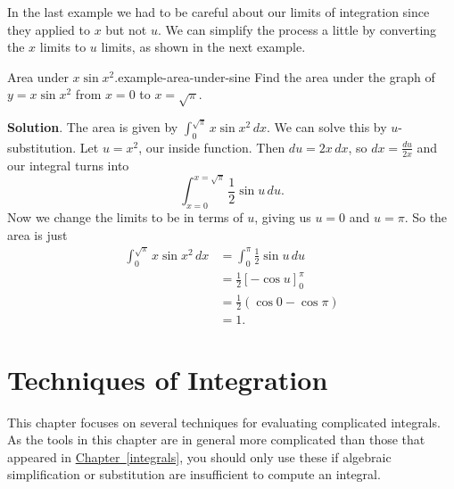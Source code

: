 \documentclass[10pt,]{book}
\numberwithin{equation}{section}
\begin{document}
\hypertarget{p-491}{}%
In the last example we had to be careful about our limits of integration since they applied to \(x\) but not \(u\). We can simplify the process a little by converting the \(x\) limits to \(u\) limits, as shown in the next example.%
\begin{example}{Area under \(x\sin x^{2}\).}{example-area-under-sine}%
\hypertarget{p-492}{}%
Find the area under the graph of \(y = x\sin x^{2}\) from \(x=0\) to \(x = \sqrt{\pi}\).%
\par\smallskip%
\noindent\textbf{Solution}.\hypertarget{solution-109}{}\quad%
\hypertarget{p-493}{}%
The area is given by \(\int_{0}^{\sqrt{\pi}}x\sin x^{2}\,dx\). We can solve this by \(u\)-substitution. Let \(u = x^{2}\), our inside function. Then \(du = 2x\,dx\), so \(dx = \frac{du}{2x}\) and our integral turns into%
\begin{equation*}
\int_{x=0}^{x=\sqrt{\pi}}\frac{1}{2}\sin u\,du.
\end{equation*}
Now we change the limits to be in terms of \(u\), giving us \(u = 0\) and \(u = \pi\). So the area is just%
\begin{align*}
\int_{0}^{\sqrt{\pi}}x\sin x^{2}\,dx & = \int_{0}^{\pi}\frac{1}{2}\sin u\,du \\
& = \frac{1}{2}[-\cos u]_{0}^{\pi} \\
& = \frac{1}{2}(\cos0 - \cos\pi) \\
& = 1. 
\end{align*}
%
\end{example}
%
%
\typeout{************************************************}
\typeout{************************************************}
%
\chapter[{Techniques of Integration}]{Techniques of Integration}\label{techniques-of-integration}
\begin{introduction}{}%
\hypertarget{p-494}{}%
This chapter focuses on several techniques for evaluating complicated integrals. As the tools in this chapter are in general more complicated than those that appeared in \hyperref[integrals]{Chapter~\ref{integrals}}, you should only use these if algebraic simplification or substitution are insufficient to compute an integral.%
\end{introduction}%
%
%
\typeout{************************************************}
\typeout{************************************************}
%
\end{document}
